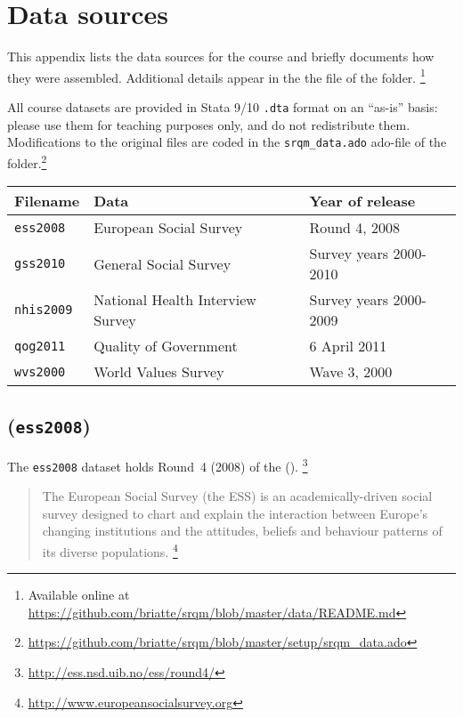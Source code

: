 \chapter[Sources]{Data sources}%
	\label{ch:data-sources}

This appendix lists the data sources for the course and briefly documents how they were assembled. Additional details appear in the the \README file of the \data folder.%
  \footnote{Available online at \url{https://github.com/briatte/srqm/blob/master/data/README.md}}

All course datasets are provided in Stata 9/10 \texttt{.dta} format on an ``as-is'' basis: please use them for teaching purposes only, and do not redistribute them. Modifications to the original files are coded in the \texttt{srqm\_data.ado} ado-file of the \setup folder.\footnote{\url{https://github.com/briatte/srqm/blob/master/setup/srqm\_data.ado}}

\bigskip
\begin{table}
\begin{center}
\footnotesize
\begin{tabular}{lll}
\toprule
Filename & Data & Year of release \\
\midrule
\quad \texttt{ess2008} & European Social Survey & Round 4, 2008 \\
\quad \texttt{gss2010} & General Social Survey & Survey years 2000-2010  \\
\quad \texttt{nhis2009} & National Health Interview Survey & Survey years 2000-2009 \\
\quad \texttt{qog2011} & Quality of Government & 6 April 2011 \\
\quad \texttt{wvs2000} & World Values Survey & Wave 3, 2000 \\
\bottomrule
\end{tabular}
\end{center}
\label{tab:data-source}
\end{table}

\section*{\ess (\texttt{ess2008})}

The \texttt{ess2008} dataset holds Round~4 (2008) of the \ess (\ESS).%
	\footnote{\url{http://ess.nsd.uib.no/ess/round4/}}

\begin{quote}
	The European Social Survey (the ESS) is an academically-driven social survey designed to chart and explain the interaction between Europe's changing institutions and the attitudes, beliefs and behaviour patterns of its diverse populations.%
	\footnote{\url{http://www.europeansocialsurvey.org}}
\end{quote}

